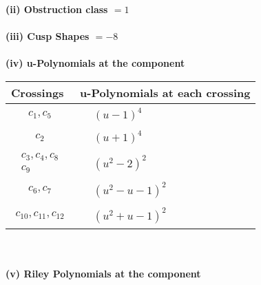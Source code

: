 \documentclass[1p]{elsarticle_modified}
\theoremstyle{definition}
\begin{document}
\flushleft \textbf{(ii) Obstruction class $= 1$}\\~\\
\flushleft \textbf{(iii) Cusp Shapes $= -8$}\\~\\
\newpage\renewcommand{\arraystretch}{1}
\flushleft \textbf{(iv) u-Polynomials at the component}\newline \\
\begin{tabular}{m{50pt}|m{274pt}}
Crossings & \hspace{64pt}u-Polynomials at each crossing \\
\hline $$\begin{aligned}c_{1},c_{5}\end{aligned}$$&$\begin{aligned}
&(u-1)^4
\end{aligned}$\\
\hline $$\begin{aligned}c_{2}\end{aligned}$$&$\begin{aligned}
&(u+1)^4
\end{aligned}$\\
\hline $$\begin{aligned}c_{3},c_{4},c_{8}\\c_{9}\end{aligned}$$&$\begin{aligned}
&(u^2-2)^2
\end{aligned}$\\
\hline $$\begin{aligned}c_{6},c_{7}\end{aligned}$$&$\begin{aligned}
&(u^2- u-1)^2
\end{aligned}$\\
\hline $$\begin{aligned}c_{10},c_{11},c_{12}\end{aligned}$$&$\begin{aligned}
&(u^2+u-1)^2
\end{aligned}$\\
\hline
\end{tabular}\\~\\
\newpage\renewcommand{\arraystretch}{1}
\flushleft \textbf{(v) Riley Polynomials at the component}\newline \\
\end{document}
